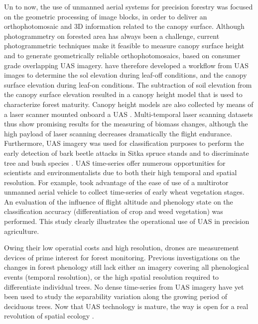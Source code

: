 \documentclass[remotesensing,article,submit,moreauthors,pdftex,12pt,a4paper]{mdpi} %
\begin{document}
Un to now, the use of unmanned aerial systems for precision forestry was focused on the geometric processing of image blocks, in order to deliver an orthophotomosaic and 3D information related to the canopy surface. 
Although photogrammetry on forested area has always been a challenge, current photogrammetric techniques make it feasible to measure canopy surface height and to generate geometrically reliable orthophotomosaics, based on consumer grade overlapping UAS imagery. 
\citeauthor{dandois_high_2013} \cite{dandois_high_2013} have therefore developed a workflow from UAS images to determine the sol elevation during leaf-off conditions, and the canopy surface elevation during leaf-on conditions. 
The subtraction of soil elevation from the canopy surface elevation resulted in a canopy height model that is used to characterize forest maturity. 
Canopy height models are also collected by means of a laser scanner mounted onboard a UAS \cite{jaakkola_low-cost_2010}. 
Multi-temporal laser scanning datasets thus show promising results for the measuring of biomass changes, although the high payload of laser scanning decreases dramatically the flight endurance.
Furthermore, UAS imagery was used for classification purposes to perform the early detection of bark beetle attacks in Sitka spruce stands \cite{drauschke_towards_2014} and to discriminate tree and bush species \cite{gini_use_2014}. 
UAS time-series offer numerous opportunities for scientists and environmentalists due to both their high temporal and spatial resolution. 
For example, \citeauthor{torres-sanchez_multi-temporal_2014} \cite{torres-sanchez_multi-temporal_2014} took advantage of the ease of use of a multirotor unmanned aerial vehicle to collect time-series of early wheat vegetation stages. 
An evaluation of the influence of flight altitude and phenology state on the classification accuracy (differentiation of crop and weed vegetation) was performed. This study clearly illustrates the operational use of UAS in precision agriculture. 

Owing their low operatial costs and high resolution, drones are measurement devices of prime interest for forest monitoring.
Previous investigations on the changes in forest phenology still lack either an imagery covering all phenological events (temporal resolution), or the high spatial resolution required to differentiate individual trees.
No dense time-series from UAS imagery have yet been used to study the separability variation along the growing period of deciduous trees.
Now that UAS technology is mature, the way is open for a real revolution of spatial ecology \cite{anderson_lightweight_2013}.
\end{document}
